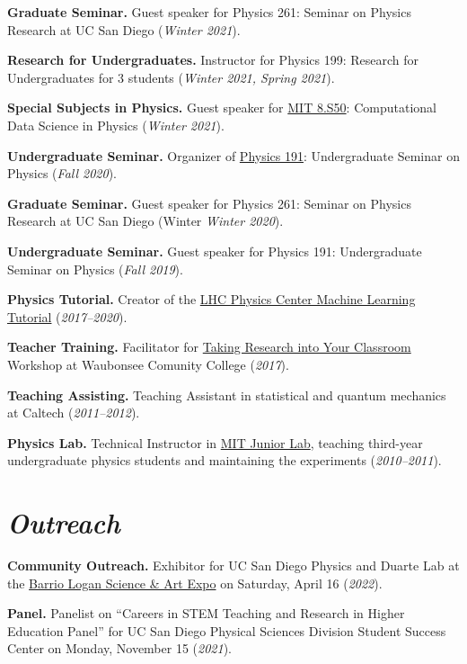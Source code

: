 \documentclass[11pt]{res}
\newcommand{\MarginText}[1]{\section{\textit{#1}}}
\begin{document}
\begin{resume}
  \textbf{Graduate Seminar.} Guest speaker for Physics 261: Seminar on Physics Research at UC San Diego (\textit{Winter 2021}).

  \textbf{Research for Undergraduates.} Instructor for Physics 199: Research for Undergraduates for 3 students (\textit{Winter 2021, Spring 2021}).

  \textbf{Special Subjects in Physics.} Guest speaker for \href{https://github.com/violatingcp/MIT_8.S50}{MIT 8.S50}: Computational Data Science in Physics (\textit{Winter 2021}).

  \textbf{Undergraduate Seminar.} Organizer of \href{https://indico.cern.ch/event/956641/}{Physics 191}: Undergraduate Seminar on Physics (\textit{Fall 2020}).

  \textbf{Graduate Seminar.} Guest speaker for Physics 261: Seminar on Physics Research at UC San Diego (Winter \textit{Winter 2020}).

  \textbf{Undergraduate Seminar.} Guest speaker for Physics 191: Undergraduate Seminar on Physics (\textit{Fall 2019}).

  \textbf{Physics Tutorial.} Creator of the \href{https://github.com/FNALLPC/machine-learning-hats}{LHC Physics Center Machine Learning Tutorial} (\textit{2017--2020}).

  \textbf{Teacher Training.} Facilitator for \href{http://eddata.fnal.gov/lasso/program_search/show_workshopID_new.lasso?event_id=435}{Taking Research into Your Classroom} Workshop at Waubonsee Comunity College (\textit{2017}).

  \textbf{Teaching Assisting.} Teaching Assistant in statistical and quantum mechanics at Caltech (\textit{2011--2012}).

  \textbf{Physics Lab.} Technical Instructor in \href{http://web.mit.edu/8.13/www/index.shtml}{MIT Junior Lab}, teaching third-year undergraduate physics students and maintaining the experiments (\textit{2010--2011}).


  \MarginText{Outreach}

  \textbf{Community Outreach.} Exhibitor for UC San Diego Physics and Duarte Lab at the \href{https://www.barriologansae.com/}{Barrio Logan Science \& Art Expo} on Saturday, April 16 (\textit{2022}).

  \textbf{Panel.} Panelist on ``Careers in STEM Teaching and Research in Higher Education Panel'' for UC San Diego Physical Sciences Division Student Success Center on Monday, November 15 (\textit{2021}).


\end{resume}
\end{document}
